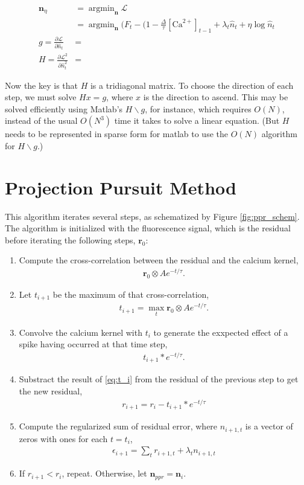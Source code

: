 \documentclass[12pt]{article}
\providecommand{\ve}[1]{\boldsymbol{#1}}
\providecommand{\ve}[1]{\boldsymbol{#1}}
\DeclareMathOperator*{\argmin}{argmin}
\newcommand{\Ca}{[\text{Ca}^{2+}]}
\newcommand{\nw}{\widehat{n}}
\begin{document}
\begin{align}
\ve{n}_{\eta} &= \argmin_{\ve{n}} \mathcal{L}\\
&=\argmin_{\ve{n}} \big(F_t - (1-\frac{\Delta}{\tau} \Ca_{t-1} + \lambda_t \nw_t + \eta \log \nw_t\\
g = \frac{\partial \mathcal{L}}{\partial \nw_t} &= \\
H = \frac{\partial \mathcal{L}^2}{\partial \nw_t^2} &=\
\end{align}

Now the key is that $H$ is a tridiagonal matrix. To choose the direction of each step, we must solve $H x = g$, where $x$ is the direction to ascend. This may be solved efficiently using Matlab's \texttt{$H \backslash g$}, for instance, which requires $O(N)$, instead of the usual $O(N^3)$ time it takes to solve a linear equation. (But $H$ needs to be represented
in sparse form for matlab to use the $O(N)$ algorithm for \texttt{$H \backslash g$}.)  

\section{Projection Pursuit Method}

This algorithm iterates several steps, as schematized by Figure \ref{fig:ppr_schem}. The algorithm is initialized with the fluorescence signal, which is the residual before iterating the following steps, $\ve{r}_0$:

\begin{enumerate}
\item Compute the cross-correlation between the residual and the calcium kernel, 
\begin{align} \ve{r}_0 \otimes A e^{-t/\tau}. \end{align}
\item Let $t_{i+1}$ be the maximum of that cross-correlation,
\begin{align} t_{i+1} = \max_t \ve{r}_0 \otimes A e^{-t/\tau}. \end{align}
\item Convolve the calcium kernel with $t_i$ to generate the exxpected effect of a spike having occurred at that time step,
\begin{align} t_{i+1} \ast e^{-t/\tau}. \end{align}
\item Substract the result of \eqref{eq:t_i} from the residual of the previous step to get the new residual,
\begin{align} r_{i+1} = r_i -  t_{i+1} \ast e^{-t/\tau} \end{align}
\item Compute the regularized sum of residual error, where $n_{i+1,t}$ is a vector of zeros with ones for each $t=t_i$,
\begin{align} \epsilon_{i+1} = \sum_t r_{i+1,t} + \lambda_t n_{i+1,t} \end{align}
\item If $r_{i+1} < r_i$, repeat.  Otherwise, let $\ve{n}_{ppr} = \ve{n}_i$.
\end{enumerate}
\end{document}
